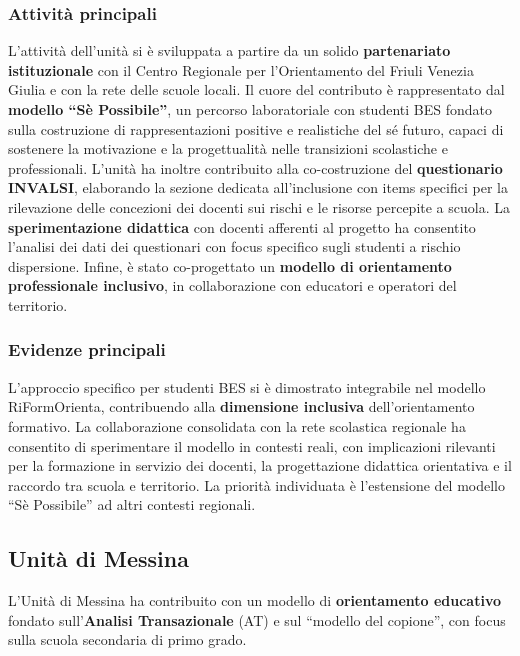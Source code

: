 \documentclass[12pt,a4paper]{article}
\begin{document}
\subsubsection{Attivit\`a principali}

L'attivit\`a dell'unit\`a si \`e sviluppata a partire da un solido \textbf{partenariato istituzionale} con il Centro Regionale per l'Orientamento del Friuli Venezia Giulia e con la rete delle scuole locali. Il cuore del contributo \`e rappresentato dal \textbf{modello ``S\`e Possibile''}, un percorso laboratoriale con studenti BES fondato sulla costruzione di rappresentazioni positive e realistiche del s\'e futuro, capaci di sostenere la motivazione e la progettualit\`a nelle transizioni scolastiche e professionali. L'unit\`a ha inoltre contribuito alla co-costruzione del \textbf{questionario INVALSI}, elaborando la sezione dedicata all'inclusione con items specifici per la rilevazione delle concezioni dei docenti sui rischi e le risorse percepite a scuola. La \textbf{sperimentazione didattica} con docenti afferenti al progetto ha consentito l'analisi dei dati dei questionari con focus specifico sugli studenti a rischio dispersione. Infine, \`e stato co-progettato un \textbf{modello di orientamento professionale inclusivo}, in collaborazione con educatori e operatori del territorio.

\subsubsection{Evidenze principali}

L'approccio specifico per studenti BES si \`e dimostrato integrabile nel modello RiFormOrienta, contribuendo alla \textbf{dimensione inclusiva} dell'orientamento formativo. La collaborazione consolidata con la rete scolastica regionale ha consentito di sperimentare il modello in contesti reali, con implicazioni rilevanti per la formazione in servizio dei docenti, la progettazione didattica orientativa e il raccordo tra scuola e territorio. La priorit\`a individuata \`e l'estensione del modello ``S\`e Possibile'' ad altri contesti regionali.


\subsection{Unit\`a di Messina}

L'Unit\`a di Messina ha contribuito con un modello di \textbf{orientamento educativo} fondato sull'\textbf{Analisi Transazionale} (AT) e sul ``modello del copione'', con focus sulla scuola secondaria di primo grado.
\end{document}
